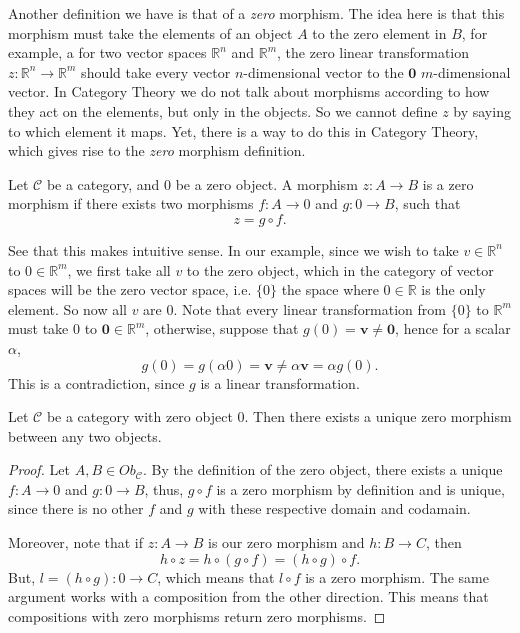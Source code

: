 Another definition we have is that of a \textit{zero} morphism. The idea here
is that this morphism must take the elements of an object $A$ to the
zero element in $B$, for example, a for two vector spaces $\mathbb R^n$ and $\mathbb R^m$,
the zero linear transformation $z:\mathbb R^n \to \mathbb R^m$ should take every vector
$n$-dimensional vector to the $\mathbf{0}$ $m$-dimensional vector. In Category
Theory we do not talk about morphisms according to how they act on the elements, but
only in the objects. So we cannot define $z$ by saying to which element it maps.
Yet, there is a way to do this in Category Theory, which gives rise to the \textit{zero} morphism
definition.
\begin{definition}
	Let $\mathcal C$ be a category, and $0$ be a zero object.
	A morphism $z:A \to B$ is a zero morphism if there exists two morphisms
	$f:A\to 0$ and $g:0 \to B$, such that
	\begin{displaymath}
		z = g \circ f.
	\end{displaymath}
\end{definition}
See that this makes intuitive sense. In our example, since we wish to take
$v \in \mathbb R^n$ to $0 \in \mathbb R^m$, we first take all $v$ to the zero object,
which in the category of vector spaces will be the zero vector space, i.e. $\{0\}$ the space
where $0 \in \mathbb R$ is the only element. So now all $v$ are $0$. Note that
every linear transformation from $\{0\}$ to $\mathbb R^m$ must take $0$ to $\mathbf{0} \in \mathbb R^m$,
otherwise, suppose that $g(0)=\mathbf{v} \neq \mathbf{0}$, hence for a scalar $\alpha$,
\begin{displaymath}
	g(0) = g(\alpha0) = \mathbf{v} \neq \alpha \mathbf{v} = \alpha g(0).
\end{displaymath}
This is a contradiction, since $g$ is a linear transformation.

\begin{theorem}
	Let $\mathcal C$ be a category with zero object $0$.
	Then there exists a unique zero morphism between any two objects.
\end{theorem}
\begin{proof}
	Let $A, B \in Ob_\mathcal C$.
	By the definition of the zero object, there exists a unique
	$f:A \to 0$ and $g:0\to B$, thus, $g \circ f$ is a zero morphism
	by definition and is unique, since there is no other $f$ and $g$ with these respective
	domain and codamain.

	Moreover, note that if $z:A \to B$ is our zero morphism and $h:B \to C$, then
	\begin{displaymath}
		h \circ z = h \circ (g \circ f) = (h \circ g) \circ f.
	\end{displaymath}
	But, $l =(h \circ g):0 \to C$, which means that $l \circ f$ is a zero morphism.
	The same argument works with a composition from the other direction. This means
	that compositions with zero morphisms return zero morphisms.
\end{proof}

